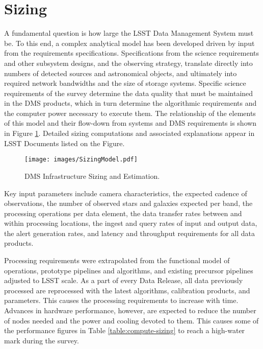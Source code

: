 \section{Sizing}\label{sizing}

A fundamental question is how large the LSST Data Management System must be. To
this end, a complex analytical model has been developed driven by input from
the requirements specifications. Specifications from the science requirements
and other subsystem designs, and the observing strategy, translate directly
into numbers of detected sources and astronomical objects, and ultimately into
required network bandwidths and the size of storage systems. Specific science
requirements of the survey determine the data quality that must be maintained
in the DMS products, which in turn determine the algorithmic requirements and
the computer power necessary to execute them. The relationship of the elements
of this model and their flow-down from systems and DMS requirements is shown in
Figure \ref{fig:sizing-model}. Detailed sizing computations and associated
explanations appear in LSST Documents listed on the Figure.

\begin{figure}
\centering
\texttt{[image: images/SizingModel.pdf]}
\caption{DMS Infrastructure Sizing and Estimation.}
\label{fig:sizing-model}
\nocite{LDM-148,LDM-151,LDM-152,LDM-135,LDM-138,LDM-140,LDM-129}
\nocite{LSE-81,LSE-82,LDM-141,LDM-139,LDM-144,LDM-143}
\nocite{LPM-17,LSE-29,LSE-30,LSE-61,LSE-163}
\nocite{Document-5373,LDM-142,LSE-78}
\end{figure}

Key input parameters include camera characteristics, the expected cadence of
observations, the number of observed stars and galaxies expected per band, the
processing operations per data element, the data transfer rates between and
within processing locations, the ingest and query rates of input and output
data, the alert generation rates, and latency and throughput requirements for
all data products.

Processing requirements were extrapolated from the functional model of
operations, prototype pipelines and algorithms, and existing precursor
pipelines adjusted to LSST scale.  As a part of every Data Release, all data
previously processed are reprocessed with the latest algorithms, calibration
products, and parameters. This causes the processing requirements to increase
with time.  Advances in hardware performance, however, are expected to reduce
the number of nodes needed and the power and cooling devoted to them. This causes some of the performance figures in Table \ref{table:compute-sizing} to reach
a high-water mark during the survey.

